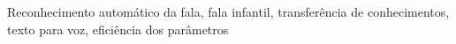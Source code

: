 \acresetall

\noindent Reconhecimento automático da fala, fala infantil, transferência de conhecimentos, texto para voz, eficiência dos parâmetros